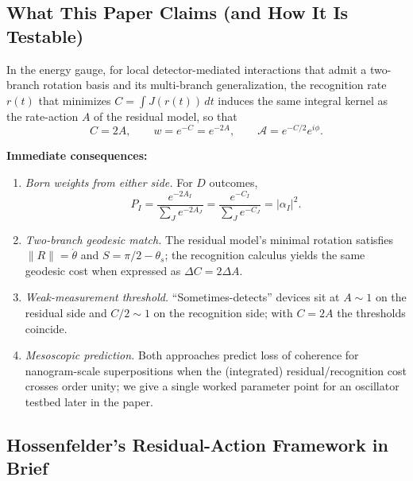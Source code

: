 \documentclass[11pt,letterpaper]{article}
\begin{document}
\subsection{What This Paper Claims (and How It Is Testable)}

\begin{tcolorbox}[colback=blue!5,colframe=blue!60!black,title=\textbf{Working Claim},breakable]
In the energy gauge, for local detector-mediated interactions that admit a two-branch rotation basis and its multi-branch generalization, the recognition rate $r(t)$ that minimizes $C=\int J(r(t))\,dt$ induces the same integral kernel as the rate-action $A$ of the residual model, so that
\[
C=2A,\qquad w=e^{-C}=e^{-2A},\qquad \mathcal{A}=e^{-C/2}e^{i\phi}.
\]
\end{tcolorbox}

\noindent\textbf{Immediate consequences:}

\begin{enumerate}[leftmargin=*, itemsep=0.3em]
\item \emph{Born weights from either side.} For $D$ outcomes,
\[
P_I=\frac{e^{-2A_I}}{\sum_J e^{-2A_J}}=\frac{e^{-C_I}}{\sum_J e^{-C_J}}=|\alpha_I|^2.
\]

\item \emph{Two-branch geodesic match.} The residual model's minimal rotation satisfies $\|R\|=\dot{\theta}$ and $S=\pi/2-\theta_s$; the recognition calculus yields the same geodesic cost when expressed as $\Delta C=2\Delta A$.

\item \emph{Weak-measurement threshold.} ``Sometimes-detects'' devices sit at $A\sim 1$ on the residual side and $C/2\sim 1$ on the recognition side; with $C=2A$ the thresholds coincide.

\item \emph{Mesoscopic prediction.} Both approaches predict loss of coherence for nanogram-scale superpositions when the (integrated) residual/recognition cost crosses order unity; we give a single worked parameter point for an oscillator testbed later in the paper.
\end{enumerate}

\subsection{Hossenfelder's Residual-Action Framework in Brief}
\end{document}
